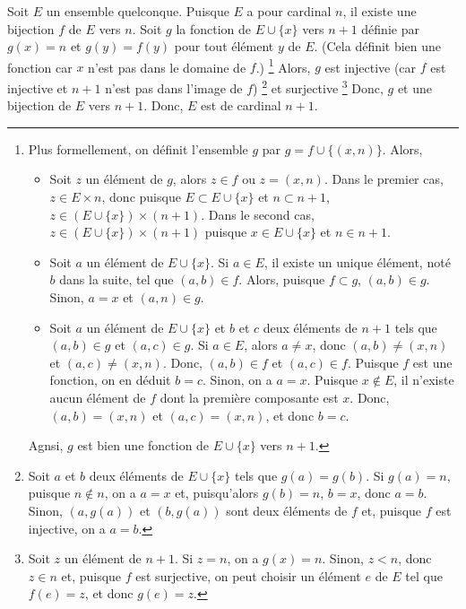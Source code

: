     Soit $E$ un ensemble quelconque. 
    Puisque $E$ a pour cardinal $n$, il existe une bijection $f$ de $E$ vers $n$. 
    Soit $g$ la fonction de $E \cup \lbrace x \rbrace$ vers $n+1$ définie par $g(x) = n$ et $g(y) = f(y)$ pour tout élément $y$ de $E$.
    (Cela définit bien une fonction car $x$ n'est pas dans le domaine de $f$.)%
    \footnote{
        Plus formellement, on définit l'ensemble $g$ par $g = f \cup \lbrace (x,n) \rbrace$. 
        Alors, 
        \begin{itemize}[nosep]
            \item Soit $z$ un élément de $g$, alors $z \in f$ ou $z = (x,n)$. 
                Dans le premier cas, $z \in E \times n$, donc puisque $E \subset E \cup \lbrace x \rbrace$ et $n \subset n+1$, $z \in \left( E \cup \lbrace x \rbrace \right) \times (n+1)$.
                Dans le second cas, $z \in \left( E \cup \lbrace x \rbrace \right) \times (n+1)$ puisque $x \in E \cup \lbrace x \rbrace$ et $n \in n+1$.
            \item Soit $a$ un élément de $E \cup \lbrace x \rbrace$. 
                Si $a \in E$, il existe un unique élément, noté $b$ dans la suite, tel que $(a,b) \in f$. 
                Alors, puisque $f \subset g$, $(a,b) \in g$.
                Sinon, $a = x$ et $(a, n) \in g$.
            \item Soit $a$ un élément de $E \cup \lbrace x \rbrace$ et $b$ et $c$ deux éléments de $n+1$ tels que $(a,b) \in g$ et $(a,c) \in g$.
                Si $a \in E$, alors $a \neq x$, donc $(a,b) \neq (x,n)$ et $(a,c) \neq (x,n)$.
                Donc, $(a,b) \in f$ et $(a,c) \in f$.
                Puisque $f$ est une fonction, on en déduit $b = c$.
                Sinon, on a $a = x$. 
                Puisque $x \notin E$, il n'existe aucun élément de $f$ dont la première composante est $x$. 
                Donc, $(a,b) = (x,n)$ et $(a,c) = (x,n)$, et donc $b = c$.
        \end{itemize}
        Agnsi, $g$ est bien une fonction de $E \cup \lbrace x \rbrace$ vers $n+1$.
    }
    Alors, $g$ est injective (car $f$ est injective et $n+1$ n'est pas dans l'image de $f$)%
    \footnote{
        Soit $a$ et $b$ deux éléments de $E \cup \lbrace x \rbrace$ tels que $g(a) = g(b)$.
        Si $g(a) = n$, puisque $n \notin n$, on a $a = x$ et, puisqu'alors $g(b) = n$, $b = x$, donc $a = b$. 
        Sinon, $(a,g(a))$ et $(b,g(a))$ sont deux éléments de $f$ et, puisque $f$ est injective, on a $a = b$. 
    }
    et surjective%
    \footnote{
        Soit $z$ un élément de $n+1$. 
        Si $z = n$, on a $g(x) = n$. 
        Sinon, $z < n$, donc $z \in n$ et, puisque $f$ est surjective, on peut choisir un élément $e$ de $E$ tel que $f(e) = z$, et donc $g(e) = z$.
    }
    Donc, $g$ et une bijection de $E$ vers $n+1$.
    Donc, $E$ est de cardinal $n+1$.

